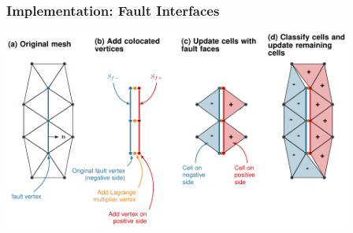 \documentclass{beamer}
\begin{document}
\begin{frame}
  \frametitle{Implementation: Fault Interfaces}
 
   \vfill
   \begin{center}
     \includegraphics[width=4.5in]{figs/cohesivecell}
   \end{center}
   
 \end{frame}
 
\end{document}
